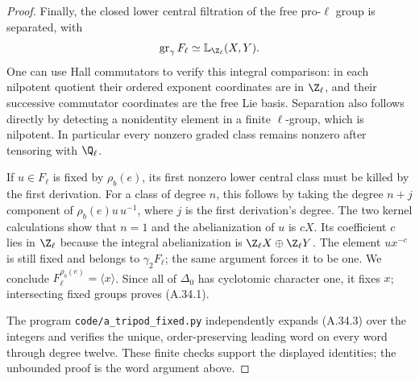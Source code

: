 \begin{proof}
Finally, the closed lower central filtration of the free
pro-$\ell$ group is separated, with
\[
 \operatorname{gr}_\gamma F_\ell
                  \simeq\mathbb L_{\Z_\ell}(X,Y).
\]
One can use Hall commutators to verify this integral comparison:
in each nilpotent quotient their ordered exponent coordinates
are in $\Z_\ell$, and their successive commutator coordinates
are the free Lie basis. Separation also follows directly by
detecting a nonidentity element in a finite $\ell$-group,
which is nilpotent. In particular every nonzero graded class
remains nonzero after tensoring with $\Q_\ell$.

If $u\in F_\ell$ is fixed by $\rho_b(e)$, its first nonzero
lower central class must be killed by the first derivation.
For a class of degree $n$, this follows by taking the
degree $n+j$ component of $\rho_b(e)u\,u^{-1}$, where $j$ is
the first derivation's degree. The two kernel calculations
show that $n=1$ and the abelianization of $u$ is $cX$.
Its coefficient $c$ lies in $\Z_\ell$ because the integral
abelianization is $\Z_\ell X\oplus\Z_\ell Y$. The element
$ux^{-c}$ is still fixed and belongs to $\gamma_2F_\ell$;
the same argument forces it to be one. We conclude
$F_\ell^{\rho_b(e)}=\langle x\rangle$. Since all of
$\Delta_0$ has cyclotomic character one, it fixes $x$;
intersecting fixed groups proves (A.34.1).

The program \texttt{code/a\_tripod\_fixed.py} independently
expands (A.34.3) over the integers and verifies the unique,
order-preserving leading word on every word through degree
twelve. These finite checks support the displayed identities;
the unbounded proof is the word argument above.
\end{proof}
